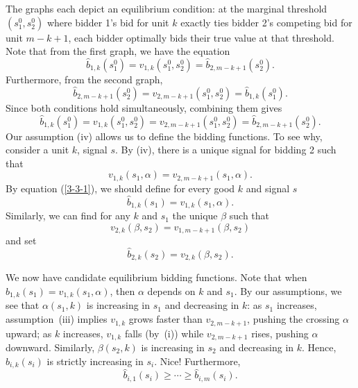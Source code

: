 The graphs each depict an equilibrium condition: at the marginal threshold $(s_1^0, s_2^0)$ where bidder 1's bid for unit $k$ exactly ties bidder 2's competing bid for unit $m-k+1$, each bidder optimally bids their true value at that threshold.
Note that from the first graph, we have the equation \[
	\hat{b}_{1,k}(s_1^{0}) = v_{1,k}(s_1^{0},s_2^{0}) = \hat{b}_{2,m-k+1}(s_2^{0})
.\]
Furthermore, from the second graph, \[
	\hat{b}_{2,m-k+1}(s_2^{0}) = v_{2,m-k+1}(s_1^{0}, s_2^{0}) = \hat{b}_{1,k}(s_1^{0})
.\]
Since both conditions hold simultaneously, combining them gives \begin{equation} \label{3-3-1}
	\hat{b}_{1,k}(s_1^{0}) = v_{1,k}(s_1^0 , s_2^0) = v_{2, m-k+1}(s_1^0, s_2^0) = \hat{b}_{2,m-k+1}(s_2^{0})
.\end{equation} 
Our assumption (iv)	 allows us to define the bidding functions. To see why, consider a unit $k$, signal $s$. By (iv), there is a unique signal for bidding 2 such that \[
	v_{1,k}(s_1,\alpha) = v_{2,m-k+1}(s_1,\alpha)
	.\] By equation (\ref{3-3-1}), we should define for every good $k$ and signal $s$ \[
	\hat{b}_{1,k}(s_1) = v_{1,k}(s_1,\alpha)
.\] Similarly, we can find for any $k$ and $s_1$ the unique $\beta$ such that \[
	v_{2,k}(\beta,s_2) = v_{1,m-k+1}(\beta,s_2)
\] and set \[
	\hat{b}_{2,k}(s_2) = v_{2,k}(\beta,s_2)
.\] 

We now have candidate equilibrium bidding functions. 
Note that when $\hat{b}_{1,k}(s_1) = v_{1,k}(s_1,\alpha)$, then $\alpha$ depends on $k$ and $s_1$. By our assumptions, we see that $\alpha(s_1,k)$ is increasing in $s_1$ and decreasing in $k$: as $s_1$ increases, assumption~(iii) implies $v_{1,k}$ grows faster than $v_{2,m-k+1}$, pushing the crossing $\alpha$ upward; as $k$ increases, $v_{1,k}$ falls (by~(i)) while $v_{2,m-k+1}$ rises, pushing $\alpha$ downward. Similarly, $\beta(s_2,k)$ is increasing in $s_2$ and decreasing in $k$.
Hence, $\hat{b}_{i,k}(s_i)$ is strictly increasing in $s_i$. Nice! Furthermore, \[
	\hat{b}_{i,1}(s_i) \ge \cdots \ge \hat{b}_{i,m}(s_i)
.\] 

